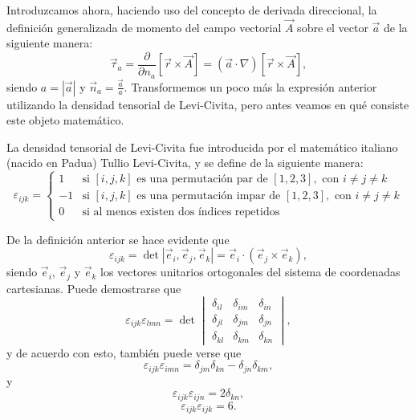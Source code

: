 \documentclass[12pt,a4paper]{book}
\begin{document}
Introduzcamos ahora, haciendo uso del concepto de derivada direccional, la definición generalizada de momento del campo vectorial $\vec{A}$ sobre el vector $\vec{a}$ de la siguiente manera:
\begin{equation}
\vec{\tau}_a = \frac{\partial}{\partial n_a}[\vec{r} \times \vec{A}] = (\vec{a} \cdot \nabla)[\vec{r} \times \vec{A}],
\end{equation}
siendo $a = |\vec{a}|$ y $\vec{n}_a = \frac{\vec{a}}{a}$. Transformemos un poco más la expresión anterior utilizando la densidad tensorial de Levi-Civita, pero antes veamos en qué consiste este objeto matemático.

La densidad tensorial de Levi-Civita fue introducida por el matemático italiano (nacido en Padua) Tullio Levi-Civita, y se define de la siguiente manera:
\begin{equation}
\varepsilon_{ijk} = 
\begin{cases}
1 & \text{si } [i,j,k] \text{ es una permutación par de } [1,2,3], \text{ con } i \neq j \neq k \\
-1 & \text{si } [i,j,k] \text{ es una permutación impar de } [1,2,3], \text{ con } i \neq j \neq k \\
0 & \text{si al menos existen dos índices repetidos}
\end{cases}
\end{equation}

De la definición anterior se hace evidente que
\begin{equation}
\varepsilon_{ijk} = \det|\vec{e}_i, \vec{e}_j, \vec{e}_k| = \vec{e}_i \cdot (\vec{e}_j \times \vec{e}_k),
\end{equation}
siendo $\vec{e}_i$, $\vec{e}_j$ y $\vec{e}_k$ los vectores unitarios ortogonales del sistema de coordenadas cartesianas. Puede demostrarse que
\begin{equation}
\varepsilon_{ijk}\varepsilon_{lmn} = \det
\begin{vmatrix}
\delta_{il} & \delta_{im} & \delta_{in} \\
\delta_{jl} & \delta_{jm} & \delta_{jn} \\
\delta_{kl} & \delta_{km} & \delta_{kn}
\end{vmatrix},
\end{equation}
y de acuerdo con esto, también puede verse que
\begin{equation}
\varepsilon_{ijk}\varepsilon_{imn} = \delta_{jm}\delta_{kn} - \delta_{jn}\delta_{km},
\end{equation}
y
\begin{equation}
\varepsilon_{ijk}\varepsilon_{ijn} = 2\delta_{kn},
\end{equation}
\begin{equation}
\varepsilon_{ijk}\varepsilon_{ijk} = 6.
\end{equation}
\end{document}

